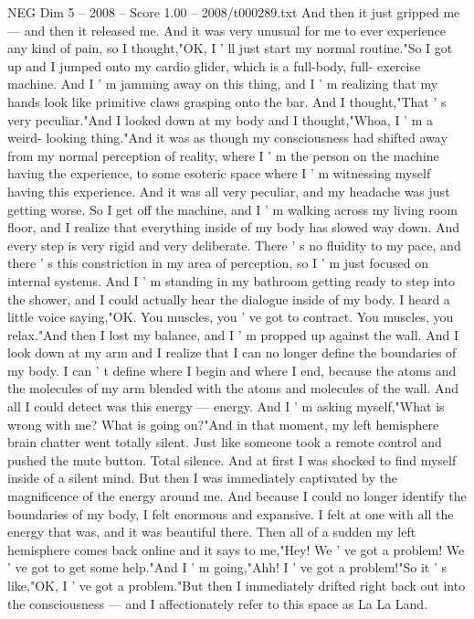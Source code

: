 \begin{textsample}{NEG Dim 5 – 2008 – Score 1.00 – 2008/t000289.txt}
And then it just gripped me — and then it released me.
And it was very unusual for me to ever experience any kind of pain, so I thought,"OK, I ' ll just start my normal routine."So I got up and I jumped onto my cardio glider, which is a full-body, full- exercise machine.
And I ' m jamming away on this thing, and I ' m realizing that my hands look like primitive claws grasping onto the bar.
And I thought,"That ' s very peculiar."And I looked down at my body and I thought,"Whoa, I ' m a weird- looking thing."And it was as though my consciousness had shifted away from my normal perception of reality, where I ' m the person on the machine having the experience, to some esoteric space where I ' m witnessing myself having this experience.
And it was all very peculiar, and my headache was just getting worse.
So I get off the machine, and I ' m walking across my living room floor, and I realize that everything inside of my body has slowed way down.
And every step is very rigid and very deliberate.
There ' s no fluidity to my pace, and there ' s this constriction in my area of perception, so I ' m just focused on internal systems.
And I ' m standing in my bathroom getting ready to step into the shower, and I could actually hear the dialogue inside of my body.
I heard a little voice saying,"OK.
You muscles, you ' ve got to contract.
You muscles, you relax."And then I lost my balance, and I ' m propped up against the wall.
And I look down at my arm and I realize that I can no longer define the boundaries of my body.
I can ' t define where I begin and where I end, because the atoms and the molecules of my arm blended with the atoms and molecules of the wall.
And all I could detect was this energy — energy.
And I ' m asking myself,"What is wrong with me?
What is going on?"And in that moment, my left hemisphere brain chatter went totally silent.
Just like someone took a remote control and pushed the mute button.
Total silence.
And at first I was shocked to find myself inside of a silent mind.
But then I was immediately captivated by the magnificence of the energy around me.
And because I could no longer identify the boundaries of my body, I felt enormous and expansive.
I felt at one with all the energy that was, and it was beautiful there.
Then all of a sudden my left hemisphere comes back online and it says to me,"Hey!
We ' ve got a problem!
We ' ve got to get some help."And I ' m going,"Ahh!
I ' ve got a problem!"So it ' s like,"OK, I ' ve got a problem."But then I immediately drifted right back out into the consciousness — and I affectionately refer to this space as La La Land.

\end{textsample}
